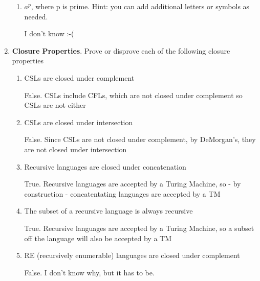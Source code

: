 \documentclass[12pt]{scrbook}
\begin{document}
\begin{enumerate}
\begin{enumerate}
        \item $a^p$, where p is prime. Hint: you can add additional letters or symbols as needed.

          I don't know :-(

      \end{enumerate}

  \item \textbf{Closure Properties}.  Prove or disprove each of the following closure properties
    \begin{enumerate}
          \item CSLs are closed under complement

            False.  CSLs include CFLs, which are not closed under complement
            so CSLs are not either

          \item CSLs are closed under intersection

            False.  Since CSLs are not closed under complement, by
            DeMorgan's, they are not closed under intersection

          \item Recursive languages are closed under concatenation

            True.  Recursive languages are accepted by a Turing Machine,
            so - by construction - concatentating languages are accepted
            by a TM

          \item The subset of a recursive language is always recursive

            True.  Recursive languages are accepted by a Turing Machine,
            so a subset off the language will also be accepted
            by a TM

          \item RE (recursively enumerable) languages are closed under complement

            False.  I don't know why, but it has to be.


    \end{enumerate}

\end{enumerate}
\end{document}
